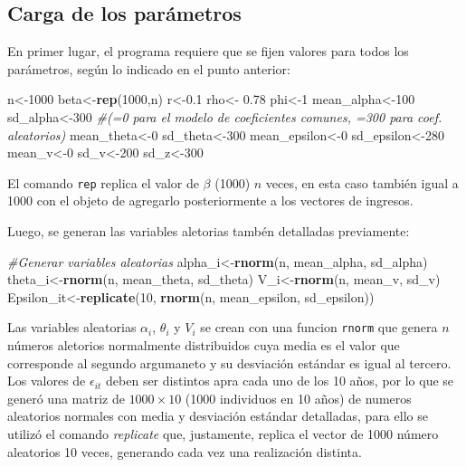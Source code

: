 \documentclass[]{article}
\newenvironment{Shaded}{\begin{snugshade}}{\end{snugshade}}
\newcommand{\KeywordTok}[1]{\textcolor[rgb]{0.13,0.29,0.53}{\textbf{{#1}}}}
\newcommand{\DecValTok}[1]{\textcolor[rgb]{0.00,0.00,0.81}{{#1}}}
\newcommand{\FloatTok}[1]{\textcolor[rgb]{0.00,0.00,0.81}{{#1}}}
\newcommand{\StringTok}[1]{\textcolor[rgb]{0.31,0.60,0.02}{{#1}}}
\newcommand{\CommentTok}[1]{\textcolor[rgb]{0.56,0.35,0.01}{\textit{{#1}}}}
\newcommand{\NormalTok}[1]{{#1}}
\begin{document}
\subsection{Carga de los parámetros}\label{carga-de-los-parametros}

En primer lugar, el programa requiere que se fijen valores para todos
los parámetros, según lo indicado en el punto anterior:

\begin{Shaded}
\begin{Highlighting}[]
\NormalTok{n<-}\DecValTok{1000}
\NormalTok{beta<-}\KeywordTok{rep}\NormalTok{(}\DecValTok{1000}\NormalTok{,n)}
\NormalTok{r<-}\FloatTok{0.1}
\NormalTok{rho<-}\StringTok{ }\FloatTok{0.78}
\NormalTok{phi<-}\DecValTok{1}
\NormalTok{mean_alpha<-}\DecValTok{100}
\NormalTok{sd_alpha<-}\DecValTok{300} \CommentTok{#(=0 para el modelo de coeficientes comunes, =300 para coef. aleatorios)}
\NormalTok{mean_theta<-}\DecValTok{0}
\NormalTok{sd_theta<-}\DecValTok{300}
\NormalTok{mean_epsilon<-}\DecValTok{0}
\NormalTok{sd_epsilon<-}\DecValTok{280}
\NormalTok{mean_v<-}\DecValTok{0}
\NormalTok{sd_v<-}\DecValTok{200}
\NormalTok{sd_z<-}\DecValTok{300}
\end{Highlighting}
\end{Shaded}

El comando \texttt{rep} replica el valor de $\beta$ (1000) $n$ veces, en
esta caso también igual a 1000 con el objeto de agregarlo posteriormente
a los vectores de ingresos.

Luego, se generan las variables aletorias tambén detalladas previamente:

\begin{Shaded}
\begin{Highlighting}[]
\CommentTok{#Generar variables aleatorias}
\NormalTok{alpha_i<-}\KeywordTok{rnorm}\NormalTok{(n, mean_alpha, sd_alpha)}
\NormalTok{theta_i<-}\KeywordTok{rnorm}\NormalTok{(n, mean_theta, sd_theta)}
\NormalTok{V_i<-}\KeywordTok{rnorm}\NormalTok{(n, mean_v, sd_v)}
\NormalTok{Epsilon_it<-}\KeywordTok{replicate}\NormalTok{(}\DecValTok{10}\NormalTok{, }\KeywordTok{rnorm}\NormalTok{(n, mean_epsilon, sd_epsilon)) }
\end{Highlighting}
\end{Shaded}

Las variables aleatorias $\alpha_{i}$, $\theta_{i}$ y $V_{i}$ se crean
con una funcion \texttt{rnorm} que genera $n$ números aletorios
normalmente distribuidos cuya media es el valor que corresponde al
segundo argumaneto y su desviación estándar es igual al tercero. Los
valores de $\epsilon_{it}$ deben ser distintos apra cada uno de los 10
años, por lo que se generó una matriz de $1000\times 10$ (1000
individuos en 10 años) de numeros aleatorios normales con media y
desviación estándar detalladas, para ello se utilizó el comando
\emph{replicate} que, justamente, replica el vector de 1000 número
aleatorios 10 veces, generando cada vez una realización distinta.
\end{document}

